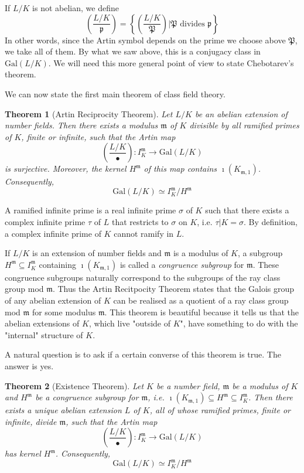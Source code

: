 \documentclass[]{amsart}
\newtheorem{theorem}{Theorem}
\newcommand{\rarr}{\longrightarrow}
\newcommand{\m}{\mathfrak{m}}
\newcommand{\IKm}{I^\mathfrak{m}_K}
\newcommand{\Kmo}{K_{\mathfrak{m},1}}
\newcommand{\p}{\mathfrak{p}}
\renewcommand{\P}{\mathfrak{P}}
\newcommand{\Frob}[2]{\left(\frac{#1}{#2}\right )}
\newcommand{\Gal}{\text{Gal}}
\begin{document}
		If $L/K$ is not abelian, we define
		\[\Frob{L/K}{\p}=\left \{\Frob{L/K}{\P}\left| \P\text{ divides }\p\right .\right \}\]
		In other words, since the Artin symbol depends on the prime we choose above $\P$, we take all of them. By what we saw above, this is a conjugacy class in $\Gal(L/K)$. We will need this more general point of view to state Chebotarev's theorem. 
		
		We can now state the first main theorem of class field theory.
		
		\begin{theorem}[Artin Reciprocity Theorem]
			Let $L/K$ be an abelian extension of number fields. Then there exists a modulus $\m$ of $K$ divisible by all ramified primes of $K$, finite or infinite, such that the Artin map
			\[\Frob{L/K}{\bullet}:\IKm\rarr\Gal(L/K)\]
			is surjective. Moreover, the kernel $H^\m$ of this map contains $\imath(\Kmo)$. Consequently,
			\[\Gal(L/K)\simeq \IKm/H^\m\]
		\end{theorem}

		A ramified infinite prime is a real infinite prime $\sigma$ of $K$ such that there exists a complex infinite prime $\tau$ of $L$ that restricts to $\sigma$ on $K$, i.e. $\tau|K=\sigma$. By definition, a complex infinite prime of $K$ cannot ramify in $L$. 	
		
		If $L/K$ is an extension of number fields and $\m$ is a modulus of $K$, a subgroup $H^\m\subseteq\IKm$ containing $\imath(\Kmo)$ is called a \emph{congruence subgroup} for $\m$. These congruence subgroups naturally correspond to the subgroups of the ray class group mod $\m$. Thus the Artin Recitpocity Theorem states that the Galois group of any abelian extension of $K$ can be realised as a quotient of a ray class group mod $\m$ for some modulus $\m$. This theorem is beautiful because it tells us that the abelian extensions of $K$, which live "outside of $K$", have something to do with the "internal" structure of $K$. 
		
		A natural question is to ask if a certain converse of this theorem is true. The answer is yes.
		
		\begin{theorem}[Existence Theorem]
			Let $K$ be a number field, $\m$ be a modulus of $K$	and $H^\m$ be a congruence subgroup for $\m$, i.e. $\imath(\Kmo)\subseteq H^\m\subseteq\IKm$. Then there exists a unique abelian extension $L$ of $K$, all of whose ramified primes, finite or infinite, divide $\m$, such that the Artin map
			\[\Frob{L/K}{\bullet}:\IKm\rarr\Gal(L/K)\]
			has kernel $H^\m$. Consequently,
			\[\Gal(L/K)\simeq \IKm/H^\m\]
		\end{theorem}
\end{document}
